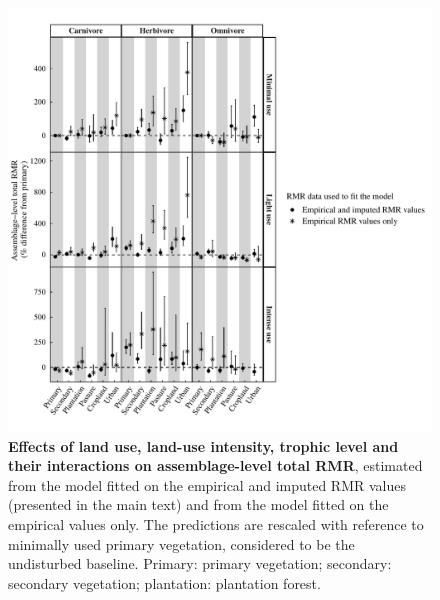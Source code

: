 \begin{figure}[h!]
\centering\includegraphics[scale=0.8]{Supporting/Chapter5/Figures/Complete_VS_imputed_total}
\caption[Effects of land use, land-use intensity, trophic level and their interactions on assemblage-level total RMR: empirical versus imputed]{\textbf{Effects of land use, land-use intensity, trophic level and their interactions on assemblage-level total RMR}, estimated from the model fitted on the empirical and imputed RMR values (presented in the main text) and from the model fitted on the empirical values only. The predictions are rescaled with reference to minimally used primary vegetation, considered to be the undisturbed baseline. Primary: primary vegetation; secondary: secondary vegetation; plantation: plantation forest.}
\label{SI5_figure5}
\end{figure}


